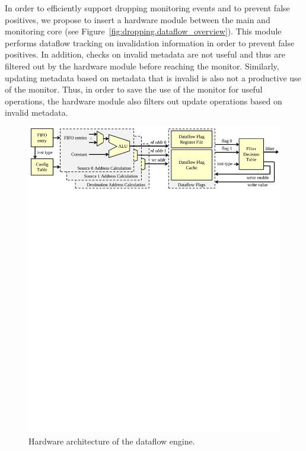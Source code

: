 In order to efficiently support dropping monitoring events and to prevent false
positives, we propose to insert a hardware module between the main and
monitoring core (see Figure~\ref{fig:dropping.dataflow_overview}). 
This module performs dataflow tracking on invalidation information in
order to prevent false positives. In addition, checks on invalid metadata are not useful and
thus are filtered out by the hardware module before reaching the monitor.
Similarly, updating metadata based on metadata that is invalid is also not a
productive use of the monitor. Thus, in order to save the use of the monitor
for useful operations, the hardware module also filters out update operations
based on invalid metadata.

\begin{figure}
  \begin{center}
    \includegraphics[width=\linewidth]{figs/dataflow_architecture.pdf}
    \vspace{-0.2in}
    \caption{Hardware architecture of the dataflow engine.}
    \label{fig:dropping.dataflow} 
    \vspace{-0.1in}
  \end{center}
\end{figure}

